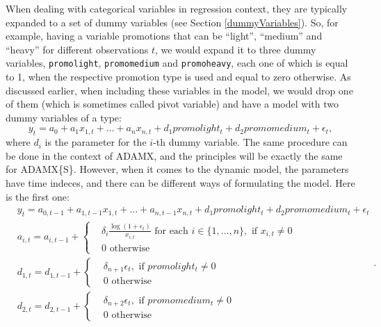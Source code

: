 \documentclass[
]{book}
\theoremstyle{definition}
\theoremstyle{definition}
\theoremstyle{definition}
\theoremstyle{definition}
\theoremstyle{remark}
\begin{document}
When dealing with categorical variables in regression context, they are typically expanded to a set of dummy variables (see Section \ref{dummyVariables}). So, for example, having a variable promotions that can be ``light'', ``medium'' and ``heavy'' for different observations \(t\), we would expand it to three dummy variables, \texttt{promolight}, \texttt{promomedium} and \texttt{promoheavy}, each one of which is equal to 1, when the respective promotion type is used and equal to zero otherwise. As discussed earlier, when including these variables in the model, we would drop one of them (which is sometimes called pivot variable) and have a model with two dummy variables of a type:
\begin{equation}
  y_t = a_0 + a_1 x_{1,t} + \dots + a_n x_{n,t} + d_1 promolight_t + d_2 promomedium_t + \epsilon_t,
  \label{eq:RegressionWithDummies}
\end{equation}
where \(d_i\) is the parameter for the \(i\)-th dummy variable. The same procedure can be done in the context of ADAMX, and the principles will be exactly the same for ADAMX\{S\}. However, when it comes to the dynamic model, the parameters have time indeces, and there can be different ways of formulating the model. Here is the first one:
\begin{equation}
  \begin{aligned}
    & y_{t} = a_{0,t-1} + a_{1,t-1} x_{1,t} + \dots + a_{n,t-1} x_{n,t} + d_1 promolight_t + d_2 promomedium_t + \epsilon_t \\
    & a_{i,t} = a_{i,t-1} + \left \lbrace \begin{aligned}
                  &\delta_i \frac{\log(1+\epsilon_t)}{x_{i,t}} \text{ for each } i \in \{1, \dots, n\}, \text{ if } x_{i,t}\neq 0 \\
                  &0 \text{ otherwise }
            \end{aligned} \right. \\
    & d_{1,t} = d_{1,t-1} + \left \lbrace \begin{aligned}
                  &\delta_{n+1} \epsilon_t, \text{ if } promolight_t\neq 0 \\
                  &0 \text{ otherwise }
            \end{aligned} \right. \\
    & d_{2,t} = d_{2,t-1} + \left \lbrace \begin{aligned}
                  &\delta_{n+2} \epsilon_t, \text{ if } promomedium_t\neq 0 \\
                  &0 \text{ otherwise }
            \end{aligned} \right.
  \end{aligned} .
  \label{eq:ETSXDynamicDummies01}
\end{equation}
\end{document}
